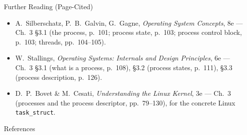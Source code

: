 \documentclass[aspectratio=169]{beamer}
\begin{document}
\begin{frame}{Further Reading (Page-Cited)}
  \footnotesize
  \begin{itemize}
    \item A.~Silberschatz, P.~B.~Galvin, G.~Gagne, \emph{Operating System
      Concepts}, 8e --- Ch.~3 \S3.1 (the process, p.~101; process state,
      p.~103; process control block, p.~103; threads, pp.~104--105).
    \item W.~Stallings, \emph{Operating Systems: Internals and Design
      Principles}, 6e --- Ch.~3 \S3.1 (what is a process, p.~108), \S3.2
      (process states, p.~111), \S3.3 (process description, p.~126).
    \item D.~P.~Bovet \& M.~Cesati, \emph{Understanding the Linux Kernel}, 3e
      --- Ch.~3 (processes and the process descriptor, pp.~79--130), for the
      concrete Linux \texttt{task\_struct}.
  \end{itemize}
  \vspace{0.2cm}
\end{frame}

\begin{frame}[allowframebreaks]{References}
  \footnotesize
  
  
\end{frame}
\end{document}
